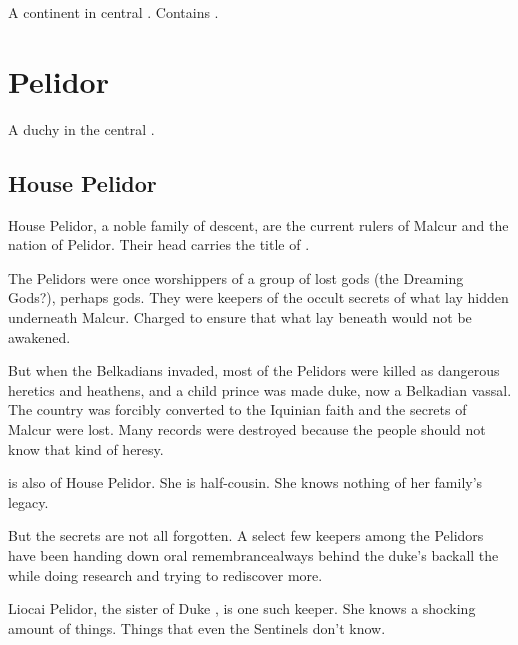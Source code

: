 \section{\PelidorContinent}
\label{\PelidorContinent}
\index{\PelidorContinent}
A continent in central \hs{\Azmith}. Contains . 















\section{Pelidor}
\label{Pelidor}
A duchy in the central \hs{\PelidorContinent}.







\subsection{House Pelidor}
House Pelidor, a \scathaese{} noble family of \Tepharin{} descent, are the current rulers of Malcur and the nation of Pelidor. Their head carries the title of .

The Pelidors were once worshippers of a group of lost gods (the Dreaming Gods?), perhaps \Tepharin{} gods. They were keepers of the occult secrets of what lay hidden underneath Malcur. Charged to ensure that what lay beneath would not be awakened. 

But when the Belkadians invaded, most of the Pelidors were killed as dangerous heretics and heathens, and a child prince was made duke, now a Belkadian vassal. The country was forcibly converted to the Iquinian faith and the secrets of Malcur were lost. Many records were destroyed because the people should not know that kind of heresy. 

\Tiroco{} is also of House Pelidor. She is \Icorz{} half-cousin. She knows nothing of her family's legacy. 

But the secrets are not all forgotten. A select few keepers among the Pelidors have been handing down oral remembrance\dash always behind the duke's back\dash all the while doing research and trying to rediscover more. 

Liocai Pelidor, the sister of Duke \Icor, is one such keeper. She knows a shocking amount of things. Things that even the Sentinels don't know. 
 
